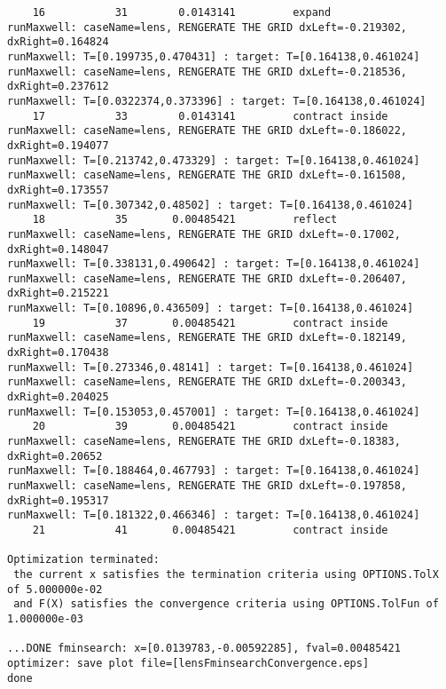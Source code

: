 \documentclass[11pt]{article}
\begin{document}
{\begin{verbatim}
    16           31        0.0143141         expand
runMaxwell: caseName=lens, RENGERATE THE GRID dxLeft=-0.219302, dxRight=0.164824
runMaxwell: T=[0.199735,0.470431] : target: T=[0.164138,0.461024]
runMaxwell: caseName=lens, RENGERATE THE GRID dxLeft=-0.218536, dxRight=0.237612
runMaxwell: T=[0.0322374,0.373396] : target: T=[0.164138,0.461024]
    17           33        0.0143141         contract inside
runMaxwell: caseName=lens, RENGERATE THE GRID dxLeft=-0.186022, dxRight=0.194077
runMaxwell: T=[0.213742,0.473329] : target: T=[0.164138,0.461024]
runMaxwell: caseName=lens, RENGERATE THE GRID dxLeft=-0.161508, dxRight=0.173557
runMaxwell: T=[0.307342,0.48502] : target: T=[0.164138,0.461024]
    18           35       0.00485421         reflect
runMaxwell: caseName=lens, RENGERATE THE GRID dxLeft=-0.17002, dxRight=0.148047
runMaxwell: T=[0.338131,0.490642] : target: T=[0.164138,0.461024]
runMaxwell: caseName=lens, RENGERATE THE GRID dxLeft=-0.206407, dxRight=0.215221
runMaxwell: T=[0.10896,0.436509] : target: T=[0.164138,0.461024]
    19           37       0.00485421         contract inside
runMaxwell: caseName=lens, RENGERATE THE GRID dxLeft=-0.182149, dxRight=0.170438
runMaxwell: T=[0.273346,0.48141] : target: T=[0.164138,0.461024]
runMaxwell: caseName=lens, RENGERATE THE GRID dxLeft=-0.200343, dxRight=0.204025
runMaxwell: T=[0.153053,0.457001] : target: T=[0.164138,0.461024]
    20           39       0.00485421         contract inside
runMaxwell: caseName=lens, RENGERATE THE GRID dxLeft=-0.18383, dxRight=0.20652
runMaxwell: T=[0.188464,0.467793] : target: T=[0.164138,0.461024]
runMaxwell: caseName=lens, RENGERATE THE GRID dxLeft=-0.197858, dxRight=0.195317
runMaxwell: T=[0.181322,0.466346] : target: T=[0.164138,0.461024]
    21           41       0.00485421         contract inside
 
Optimization terminated:
 the current x satisfies the termination criteria using OPTIONS.TolX of 5.000000e-02 
 and F(X) satisfies the convergence criteria using OPTIONS.TolFun of 1.000000e-03 

...DONE fminsearch: x=[0.0139783,-0.00592285], fval=0.00485421
optimizer: save plot file=[lensFminsearchConvergence.eps]
done
\end{verbatim}
}


  
\clearpage

\end{document}
